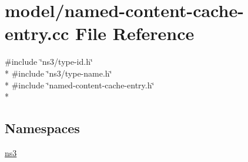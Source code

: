 \hypertarget{model_2named-content-cache-entry_8cc}{\section{model/named-\/content-\/cache-\/entry.cc File Reference}
\label{model_2named-content-cache-entry_8cc}
}
{\ttfamily \#include \char`\"{}ns3/type-\/id.\-h\char`\"{}}\\*
{\ttfamily \#include \char`\"{}ns3/type-\/name.\-h\char`\"{}}\\*
{\ttfamily \#include \char`\"{}named-\/content-\/cache-\/entry.\-h\char`\"{}}\\*
\subsection*{Namespaces}
\begin{DoxyCompactItemize}
\item 
\hyperlink{namespacens3}{ns3}
\end{DoxyCompactItemize}
